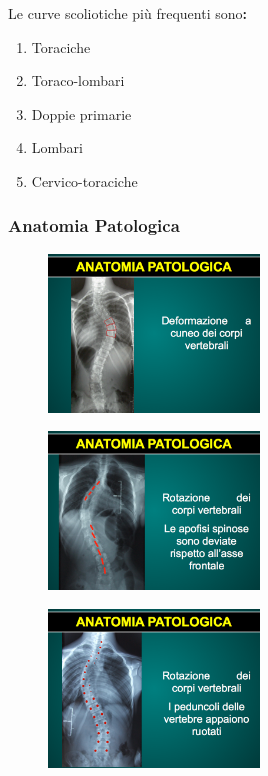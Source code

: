 Le curve scoliotiche più frequenti sono\textbf{:}

\begin{enumerate}
\def\labelenumi{\arabic{enumi}.}
\item
  Toraciche
\item 
  Toraco-lombari
\item 
  Doppie primarie
\item 
  Lombari
\item 
  Cervico-toraciche
\end{enumerate}

\subsubsection{Anatomia Patologica}

\begin{figure}[!ht]
\centering
	\includegraphics[width=0.5\textwidth]{012/image17.png}
\end{figure}
\begin{figure}[!ht]
\centering
	\includegraphics[width=0.5\textwidth]{012/image18.png}
\end{figure}
\begin{figure}[!ht]
\centering
	\includegraphics[width=0.5\textwidth]{012/image19.png}
\end{figure}
